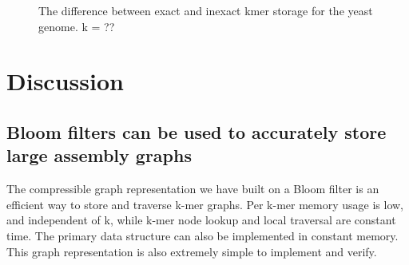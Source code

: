 \documentclass[12pt]{article} \usepackage{simplemargins}
\begin{document}
\begin{figure}
\caption{The difference between exact and inexact kmer storage for the
yeast genome. k = ??}
\end{figure}

\section{Discussion}

\subsection{Bloom filters can be used to accurately store large assembly
graphs}

The compressible graph representation we have built on a Bloom filter
is an efficient way to store and traverse k-mer graphs.  Per k-mer
memory usage is low, and independent of k, while k-mer node lookup and
local traversal are constant time.  The primary data structure can
also be implemented in constant memory.  This graph representation is
also extremely simple to implement and verify.
\end{document}
